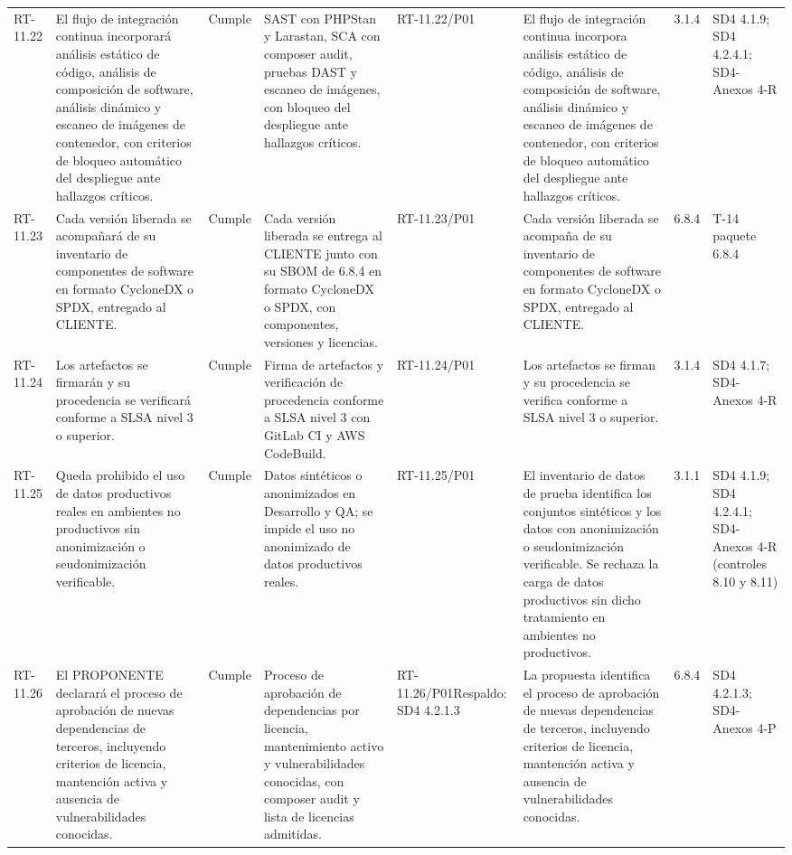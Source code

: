 \documentclass[oficio,firma,final]{lafrox}
\begin{document}
\begin{landscape}
{\begin{longtable}{@{}F{0.054} F{0.173} F{0.061} F{0.191} F{0.106} F{0.180} F{0.067} F{0.168}@{}}
  RT-11.22 & El flujo de integración continua incorporará análisis estático de código, análisis de composición de software, análisis dinámico y escaneo de imágenes de contenedor, con criterios de bloqueo automático del despliegue ante hallazgos críticos. & Cumple & SAST con PHPStan y Larastan, SCA con composer audit, pruebas DAST y escaneo de imágenes, con bloqueo del despliegue ante hallazgos críticos. & RT-11.22/\allowbreak{}P01 & El flujo de integración continua incorpora análisis estático de código, análisis de composición de software, análisis dinámico y escaneo de imágenes de contenedor, con criterios de bloqueo automático del despliegue ante hallazgos críticos. & 3.1.4 & SD4 4.1.9; SD4 4.2.4.1; SD4-Anexos 4-R  \\
  RT-11.23 & Cada versión liberada se acompañará de su inventario de componentes de software en formato CycloneDX o SPDX, entregado al CLIENTE. & Cumple & Cada versión liberada se entrega al CLIENTE junto con su SBOM de 6.8.4 en formato CycloneDX o SPDX, con componentes, versiones y licencias. & RT-11.23/\allowbreak{}P01 & Cada versión liberada se acompaña de su inventario de componentes de software en formato CycloneDX o SPDX, entregado al CLIENTE. & 6.8.4 & T-14 paquete 6.8.4  \\
  RT-11.24 & Los artefactos se firmarán y su procedencia se verificará conforme a SLSA nivel 3 o superior. & Cumple & Firma de artefactos y verificación de procedencia conforme a SLSA nivel 3 con GitLab CI y AWS CodeBuild. & RT-11.24/\allowbreak{}P01 & Los artefactos se firman y su procedencia se verifica conforme a SLSA nivel 3 o superior. & 3.1.4 & SD4 4.1.7; SD4-Anexos 4-R  \\
  RT-11.25 & Queda prohibido el uso de datos productivos reales en ambientes no productivos sin anonimización o seudonimización verificable. & Cumple & Datos sintéticos o anonimizados en Desarrollo y QA; se impide el uso no anonimizado de datos productivos reales. & RT-11.25/\allowbreak{}P01 & El inventario de datos de prueba identifica los conjuntos sintéticos y los datos con anonimización o seudonimización verificable. Se rechaza la carga de datos productivos sin dicho tratamiento en ambientes no productivos. & 3.1.1 & SD4 4.1.9; SD4 4.2.4.1; SD4-Anexos 4-R (controles 8.10 y 8.11)  \\
  RT-11.26 & El PROPONENTE declarará el proceso de aprobación de nuevas dependencias de terceros, incluyendo criterios de licencia, mantención activa y ausencia de vulnerabilidades conocidas. & Cumple & Proceso de aprobación de dependencias por licencia, mantenimiento activo y vulnerabilidades conocidas, con composer audit y lista de licencias admitidas. & RT-11.26/\allowbreak{}P01\newline Respaldo: SD4 4.2.1.3 & La propuesta identifica el proceso de aprobación de nuevas dependencias de terceros, incluyendo criterios de licencia, mantención activa y ausencia de vulnerabilidades conocidas. & 6.8.4 & SD4 4.2.1.3; SD4-Anexos 4-P  \\

\end{longtable}}
\end{landscape}
\end{document}
